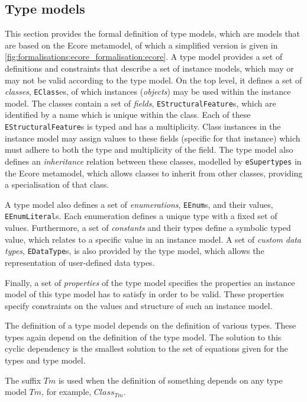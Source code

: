 \subsection{Type models}
\label{subsec:formalisations:ecore_formalisation:type_models}
This section provides the formal definition of type models, which are models that are based on the Ecore metamodel, of which a simplified version is given in \cref{fig:formalisations:ecore_formalisation:ecore}. A type model provides a set of definitions and constraints that describe a set of instance models, which may or may not be valid according to the type model. On the top level, it defines a set of \textit{classes}, \texttt{EClass}es, of which instances (\textit{objects}) may be used within the instance model. The classes contain a set of \textit{fields}, \texttt{EStructuralFeature}s, which are identified by a name which is unique within the class. Each of these \texttt{EStructuralFeature}s is typed and has a multiplicity. Class instances in the instance model may assign values to these fields (specific for that instance) which must adhere to both the type and multiplicity of the field. The type model also defines an \textit{inheritance} relation between these classes, modelled by \texttt{eSupertypes} in the Ecore metamodel, which allows classes to inherit from other classes, providing a specialisation of that class.

A type model also defines a set of \textit{enumerations}, \texttt{EEnum}s, and their values, \texttt{EEnumLiteral}s. Each enumeration defines a unique type with a fixed set of values. Furthermore, a set of \textit{constants} and their types define a symbolic typed value, which relates to a specific value in an instance model. A set of \textit{custom data types}, \texttt{EDataType}s, is also provided by the type model, which allows the representation of user-defined data types.

Finally, a set of \textit{properties} of the type model specifies the properties an instance model of this type model has to satisfy in order to be valid. These properties specify constraints on the values and structure of such an instance model.

The definition of a type model depends on the definition of various types. These types again depend on the definition of the type model. The solution to this cyclic dependency is the smallest solution to the set of equations given for the types and type model.

The suffix $Tm$ is used when the definition of something depends on any type model $Tm$, for example, $Class_{Tm}$.

